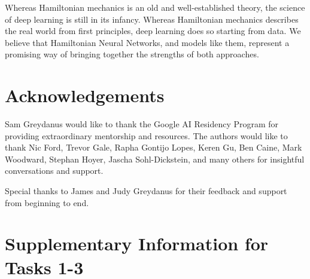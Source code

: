 \documentclass{article}
\begin{document}


Whereas Hamiltonian mechanics is an old and well-established theory, the science of deep learning is still in its infancy. Whereas Hamiltonian mechanics describes the real world from first principles, deep learning does so starting from data. We believe that Hamiltonian Neural Networks, and models like them, represent a promising way of bringing together the strengths of both approaches.

\section{Acknowledgements}   

Sam Greydanus would like to thank the Google AI Residency Program for providing extraordinary mentorship and resources. The authors would like to thank Nic Ford, Trevor Gale, Rapha Gontijo Lopes, Keren Gu, Ben Caine, Mark Woodward, Stephan Hoyer, Jascha Sohl-Dickstein, and many others for insightful conversations and support.

Special thanks to James and Judy Greydanus for their feedback and support from beginning to end.




\appendix
{}

\newpage

\section{Supplementary Information for Tasks 1-3} \label{appendix:learning}
\end{document}
